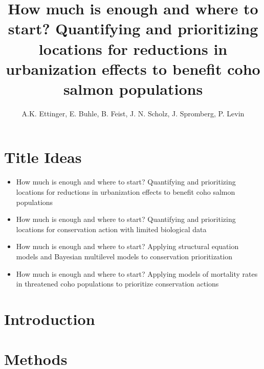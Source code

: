\documentclass{article}
\begin{document}
 
\title{How much is enough and where to start? Quantifying and prioritizing locations for reductions in urbanization effects to benefit coho salmon populations} %

\author{A.K. Ettinger, E. Buhle, B. Feist, J. N. Scholz, J. Spromberg, P. Levin}
\maketitle  %

\section*{Title Ideas}
\begin{itemize}
\item How much is enough and where to start? Quantifying and prioritizing locations for reductions in urbanization effects to benefit coho salmon populations
\item How much is enough and where to start? Quantifying and prioritizing locations for conservation action with limited biological data
\item How much is enough and where to start? Applying structural equation models and Bayesian multilevel models to conservation prioritization
\item How much is enough and where to start? Applying models of mortality rates in threatened coho populations to prioritize conservation actions
\end{itemize}
\section*{Introduction}
\section*{Methods}
\end{document}
